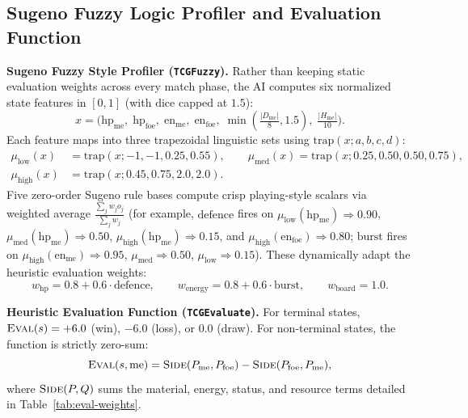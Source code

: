 \documentclass[11pt,a4paper]{article}
\newcommand{\fn}[1]{\textsc{#1}}
\begin{document}
\subsection{Sugeno Fuzzy Logic Profiler and Evaluation Function}

\textbf{Sugeno Fuzzy Style Profiler (\texttt{TCGFuzzy}).} Rather than keeping static evaluation weights across every match phase, the AI computes six normalized state features in $[0,1]$ (with $\text{dice}$ capped at $1.5$):
\[
  x = \Big(\text{hp}_{\text{me}},\; \text{hp}_{\text{foe}},\; \text{en}_{\text{me}},\; \text{en}_{\text{foe}},\; \min(\tfrac{|D_{\text{me}}|}{8}, 1.5),\; \tfrac{|H_{\text{me}}|}{10}\Big).
\]
Each feature maps into three trapezoidal linguistic sets using $\mathrm{trap}(x; a,b,c,d)$:
\begin{equation}
  \begin{aligned}
    \mu_{\text{low}}(x)  &= \mathrm{trap}(x; -1, -1, 0.25, 0.55), \qquad
    \mu_{\text{med}}(x)  = \mathrm{trap}(x; 0.25, 0.50, 0.50, 0.75), \\
    \mu_{\text{high}}(x) &= \mathrm{trap}(x; 0.45, 0.75, 2.0, 2.0).
  \end{aligned}
\end{equation}
Five zero-order Sugeno rule bases compute crisp playing-style scalars via weighted average $\frac{\sum_j w_j o_j}{\sum_j w_j}$ (for example, $\text{defence}$ fires on $\mu_{\text{low}}(\text{hp}_{\text{me}}) \Rightarrow 0.90$, $\mu_{\text{med}}(\text{hp}_{\text{me}}) \Rightarrow 0.50$, $\mu_{\text{high}}(\text{hp}_{\text{me}}) \Rightarrow 0.15$, and $\mu_{\text{high}}(\text{en}_{\text{foe}}) \Rightarrow 0.80$; $\text{burst}$ fires on $\mu_{\text{high}}(\text{en}_{\text{me}}) \Rightarrow 0.95$, $\mu_{\text{med}} \Rightarrow 0.50$, $\mu_{\text{low}} \Rightarrow 0.15$). These dynamically adapt the heuristic evaluation weights:
\begin{equation}
  w_{\text{hp}} = 0.8 + 0.6 \cdot \text{defence}, \qquad
  w_{\text{energy}} = 0.8 + 0.6 \cdot \text{burst}, \qquad
  w_{\text{board}} = 1.0.
\end{equation}

\textbf{Heuristic Evaluation Function (\texttt{TCGEvaluate}).} For terminal states, $\fn{Eval}(s) = +6.0$ (win), $-6.0$ (loss), or $0.0$ (draw). For non-terminal states, the function is strictly zero-sum:
\begin{equation}
  \fn{Eval}(s, \text{me}) = \fn{Side}(P_{\text{me}}, P_{\text{foe}}) - \fn{Side}(P_{\text{foe}}, P_{\text{me}}),
  \label{eq:eval}
\end{equation}
where $\fn{Side}(P, Q)$ sums the material, energy, status, and resource terms detailed in Table~\ref{tab:eval-weights}.
\end{document}
